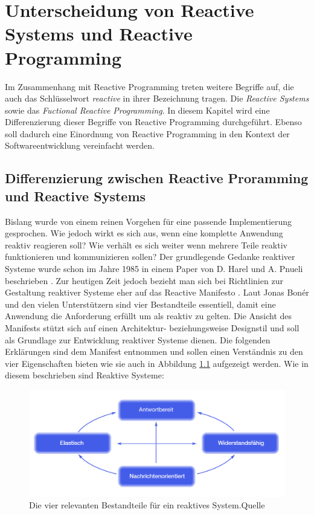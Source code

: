 \chapter{Unterscheidung von Reactive Systems und Reactive Programming}\label{abgrenzung}
Im Zusammenhang mit Reactive Programming treten weitere Begriffe auf, die auch das Schlüsselwort \textit{reactive} in ihrer Bezeichnung tragen. Die \textit{Reactive Systems} sowie das \textit{Fuctional Reactive Programming}. In diesem Kapitel wird eine Differenzierung dieser Begriffe von Reactive Programming durchgeführt. Ebenso soll dadurch eine Einordnung von Reactive Programming in den Kontext der Softwareentwicklung vereinfacht werden.
\section{Differenzierung zwischen Reactive Proramming und Reactive Systems}
Bislang wurde von einem reinen Vorgehen für eine passende Implementierung gesprochen. Wie jedoch wirkt es sich aus, wenn eine komplette Anwendung reaktiv reagieren soll? Wie verhält es sich weiter wenn mehrere Teile reaktiv funktionieren und kommunizieren sollen? Der grundlegende Gedanke reaktiver Systeme wurde schon im Jahre 1985 in einem Paper von D. Harel und A. Pnueli beschrieben \cite{Harel.1985}. Zur heutigen Zeit jedoch bezieht man sich bei Richtlinien zur Gestaltung reaktiver Systeme eher auf das Reactive Manifesto \cite{Boner.2014}. Laut Jonas Bonér und den vielen Unterstützern sind vier Bestandteile essentiell, damit eine Anwendung die Anforderung erfüllt um als reaktiv zu gelten. Die Ansicht des Manifests stützt sich auf einen Architektur- beziehungsweise Designstil und soll als Grundlage zur Entwicklung reaktiver Systeme dienen. Die folgenden Erklärungen sind dem Manifest entnommen und sollen einen Verständnis zu den vier Eigenschaften bieten wie sie auch in Abbildung \ref{pic:manifest4} aufgezeigt werden. Wie in diesem beschrieben sind Reaktive Systeme:
\begin{figure}[hbt]
	\centering
	\includegraphics[width=1\textwidth]{Abb/manifest4achsen.PNG}
	\caption{Die vier relevanten Bestandteile für ein reaktives System.Quelle \cite{Boner.2014}}
	\label{pic:manifest4}
\end{figure}
